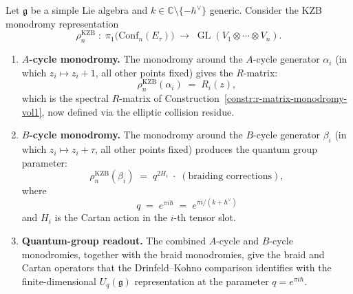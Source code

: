 \begin{theorem}
\label{thm:b-cycle-quantum-group}
Let $\mathfrak{g}$ be a simple Lie algebra and $k \in \mathbb{C}
\setminus \{-h^\vee\}$ generic. Consider the KZB monodromy
representation
\[
\rho_n^{\mathrm{KZB}}
\;\colon\;
\pi_1\bigl(\mathrm{Conf}_n(E_\tau)\bigr)
\;\longrightarrow\;
\operatorname{GL}(V_1 \otimes \cdots \otimes V_n).
\]
\begin{enumerate}[label=\textup{(\roman*)}]
\item \textbf{$A$-cycle monodromy.}
The monodromy around the $A$-cycle generator $\alpha_i$ (in which
$z_i \mapsto z_i + 1$, all other points fixed) gives the $R$-matrix:
\[
\rho_n^{\mathrm{KZB}}(\alpha_i)
\;=\;
R_i(z),
\]
which is the spectral $R$-matrix of
Construction~\textup{\ref{constr:r-matrix-monodromy-vol1}},
now defined via the elliptic collision residue.

\item \textbf{$B$-cycle monodromy.}
The monodromy around the $B$-cycle generator $\beta_i$ (in which
$z_i \mapsto z_i + \tau$, all other points fixed) produces the
quantum group parameter:
\[
\rho_n^{\mathrm{KZB}}(\beta_i)
\;=\;
q^{2H_i}
\;\cdot\;
(\text{braiding corrections}),
\]
where
\begin{equation}\label{eq:q-parameter}
q
\;=\;
e^{\pi i\hbar}
\;=\;
e^{\pi i/(k + h^\vee)}
\end{equation}
and $H_i$ is the Cartan action in the $i$-th tensor slot.

\item \textbf{Quantum-group readout.}
The combined $A$-cycle and $B$-cycle monodromies, together with the braid
monodromies, give the braid and Cartan operators that the
Drinfeld--Kohno comparison identifies with the finite-dimensional
$U_q(\mathfrak{g})$ representation at the parameter
$q = e^{\pi i\hbar}$.
\end{enumerate}
\end{theorem}

